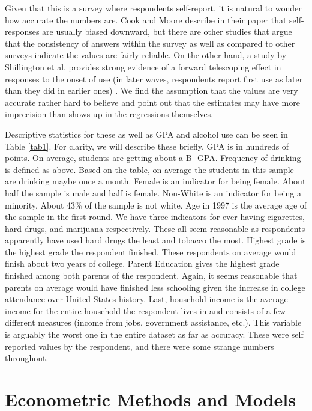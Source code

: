 \documentclass[11pt]{article}
\begin{document}
Given that this is a survey where respondents self-report, it is natural to wonder how accurate the numbers are. Cook and Moore describe in their paper that self-responses are usually biased downward, but there are other studies that argue that the consistency of answers within the survey as well as compared to other surveys indicate the values are fairly reliable. On the other hand, a study by Shillington et al. provides strong evidence of a forward telescoping effect in responses to the onset of use (in later waves, respondents report first use as later than they did in earlier ones) \cite{telescope}. We find the assumption that the values are very accurate rather hard to believe and point out that the estimates may have more imprecision than shows up in the regressions themselves.

Descriptive statistics for these as well as GPA and alcohol use can be seen in Table \ref{tab1}. For clarity, we will describe these briefly. GPA is in hundreds of points. On average, students are getting about a B- GPA. Frequency of drinking is defined as above. Based on the table, on average the students in this sample are drinking maybe once a month. Female is an indicator for being female. About half the sample is male and half is female. Non-White is an indicator for being a minority. About 43\% of the sample is not white. Age in 1997 is the average age of the sample in the first round. We have three indicators for ever having cigarettes, hard drugs, and marijuana respectively. These all seem reasonable as respondents apparently have used hard drugs the least and tobacco the most. Highest grade is the highest grade the respondent finished. These respondents on average would finish about two years of college. Parent Education gives the highest grade finished among both parents of the respondent. Again, it seems reasonable that parents on average would have finished less schooling given the increase in college attendance over United States history. Last, household income is the average income for the entire household the respondent lives in and consists of a few different measures (income from jobs, government assistance, etc.). This variable is arguably the worst one in the entire dataset as far as accuracy. These were self reported values by the respondent, and there were some strange numbers throughout.



\section*{Econometric Methods and Models}
\end{document}
